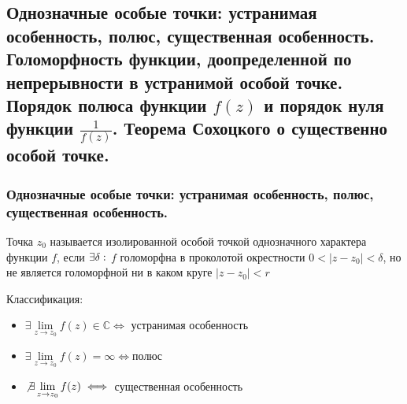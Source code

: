 \subsection{Однозначные особые точки: устранимая особенность, полюс, существенная особенность. Голоморфность функции, доопределенной по непрерывности в устранимой особой точке. Порядок полюса функции $f(z)$ и порядок нуля функции $\frac{1}{f(z)}$. Теорема Сохоцкого о существенно особой точке.}


\subsubsection{Однозначные особые точки: устранимая особенность, полюс, существенная особенность.}
\begin{definition*}
Точка $z_0$ называется изолированной особой точкой однозначного характера функции $f$, если
$\\\exists\delta:$ $f$ голоморфна в проколотой окрестности $0<|z-z_0|<\delta$, но не является голоморфной ни в каком круге $|z-z_0|<r$
\end{definition*}
Классификация:
\begin{itemize}
    \item $\exists\lim\limits_{z\rightarrow z_0} f(z)\in\mathbb{C}\iff$ устранимая особенность
    \item $\exists\lim\limits_{z\rightarrow z_0} f(z)=\infty\iff$полюс
    \item $\not\exists\lim\limits_{z\rightarrow z_0}f(z)\iff$ существенная особенность
\end{itemize}


